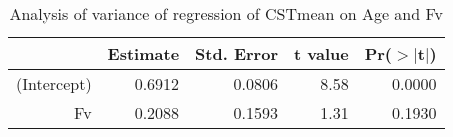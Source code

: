 \begin{table}[ht]
\centering
\caption{Analysis of variance of regression of CSTmean on Age and Fv}
\label{tab:cstfv}
\begin{tabular}{rrrrr}
  \hline
 & Estimate & Std. Error & t value & Pr($>$$|$t$|$) \\ 
  \hline
(Intercept) & 0.6912 & 0.0806 & 8.58 & 0.0000 \\ 
  Fv & 0.2088 & 0.1593 & 1.31 & 0.1930 \\ 
   \hline
\end{tabular}
\end{table}
